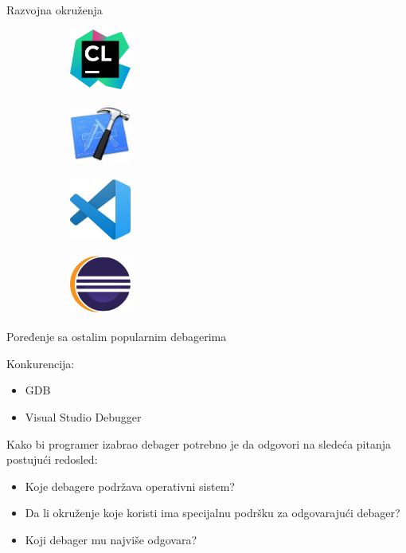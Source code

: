 \documentclass[bookmarks=true,bookmarksopen=true,pdfborder={0 0 0},pdfhighlight={/N},linkbordercolor={.5 .5 .5},implicit=false,unicode,xcolor={table}]{beamer}
\begin{document}
\begin{frame}{Razvojna okruženja}
\begin{figure}
	
	\begin{subfigure}{2cm}
		\includegraphics[width=2cm,height=2cm]{clion_logo}
	\end{subfigure}
	\begin{subfigure}{2cm}
		\includegraphics[width=2cm,height=2cm]{xcode_logo}
	\end{subfigure}
	\begin{subfigure}{2cm}
		\includegraphics[width=2cm,height=2cm]{visual_code}
	\end{subfigure}
	\begin{subfigure}{2cm}
		\includegraphics[width=2cm,height=2cm]{eclipse_logo}
	\end{subfigure}
\end{figure}
\end{frame}

\begin{frame}{Poređenje sa ostalim popularnim debagerima}
	
	Konkurencija:
	\begin{itemize}
		\item GDB
		\item Visual Studio Debugger
	\end{itemize}

	Kako bi programer izabrao debager potrebno je da odgovori na sledeća pitanja postujući redosled:
	\begin{itemize}
		\item Koje debagere podržava operativni sistem?
		\item Da li okruženje koje koristi ima specijalnu podršku za odgovarajući debager?
		\item Koji debager mu najviše odgovara?
	\end{itemize}
	
\end{frame}
\end{document}
